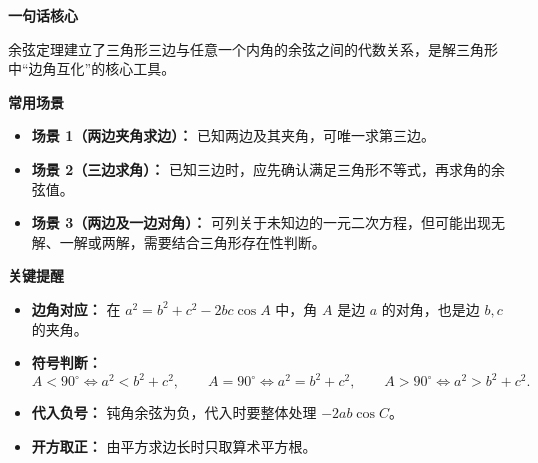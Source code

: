 \begin{summarybox}
	\textbf{\textcolor{CSummary}{一句话核心}}

	余弦定理建立了三角形三边与任意一个内角的余弦之间的代数关系，是解三角形中“边角互化”的核心工具。

	\medskip
	\textbf{\textcolor{CSummary}{常用场景}}
	\begin{itemize}[leftmargin=*, itemsep=0.5em, topsep=0.4em]
		\item \textbf{场景 1（两边夹角求边）：} 已知两边及其夹角，可唯一求第三边。
		\item \textbf{场景 2（三边求角）：} 已知三边时，应先确认满足三角形不等式，再求角的余弦值。
		\item \textbf{场景 3（两边及一边对角）：} 可列关于未知边的一元二次方程，但可能出现无解、一解或两解，需要结合三角形存在性判断。
	\end{itemize}

	\medskip
	\textbf{\textcolor{CSummary}{关键提醒}}
	\begin{itemize}[leftmargin=*, itemsep=0.5em, topsep=0.4em]
		\item \textbf{边角对应：} 在 $a^2=b^2+c^2-2bc\cos A$ 中，角 $A$ 是边 $a$ 的对角，也是边 $b,c$ 的夹角。
		\item \textbf{符号判断：}
		      \[
			      A<90^\circ \Longleftrightarrow a^2<b^2+c^2,\qquad
			      A=90^\circ \Longleftrightarrow a^2=b^2+c^2,\qquad
			      A>90^\circ \Longleftrightarrow a^2>b^2+c^2.
		      \]
		\item \textbf{代入负号：} 钝角余弦为负，代入时要整体处理 $-2ab\cos C$。
		\item \textbf{开方取正：} 由平方求边长时只取算术平方根。
	\end{itemize}
\end{summarybox}